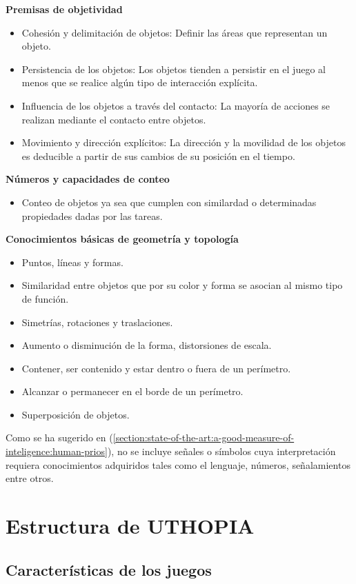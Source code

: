 \textbf{Premisas de objetividad}
\begin{itemize}
\item Cohesión y delimitación de objetos: Definir las áreas que representan un objeto.
\item Persistencia de los objetos: Los objetos tienden a persistir en el juego al menos que se realice algún tipo de interacción explícita.
\item Influencia de los objetos a través del contacto: La mayoría de acciones se realizan mediante el contacto entre objetos.
\item Movimiento y dirección explícitos: La dirección y la movilidad de los objetos es deducible a partir de sus cambios de su posición en el tiempo.
\end{itemize}

\textbf{Números y capacidades de conteo}
\begin{itemize}
    \item Conteo de objetos ya sea que cumplen con similardad o determinadas propiedades dadas por las tareas.
\end{itemize}

\textbf{Conocimientos básicas de geometría y topología}
\begin{itemize}
\item Puntos, líneas y formas.
\item Similaridad entre objetos que por su color y forma se asocian al mismo tipo de función.
\item Simetrías, rotaciones y traslaciones.
\item Aumento o disminución de la forma, distorsiones de escala.
\item Contener, ser contenido y estar dentro o fuera de un perímetro.
\item Alcanzar o permanecer en el borde de un perímetro.
\item Superposición de objetos.
\end{itemize}

Como se ha sugerido en (\ref{section:state-of-the-art:a-good-measure-of-inteligence:human-prios}), no se incluye señales o símbolos cuya interpretación requiera conocimientos adquiridos tales como el lenguaje, números, señalamientos entre otros. 

\section{Estructura de UTHOPIA}

\subsection{Características de los juegos}

